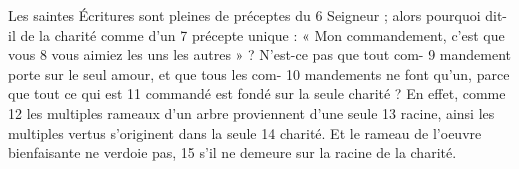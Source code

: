Les saintes Écritures sont pleines de préceptes du	 
6	 	Seigneur ; alors pourquoi dit-il de la charité comme d'un	 
7	 	précepte unique : « Mon commandement, c'est que vous	 
8	 	vous aimiez les uns les autres » ? N'est-ce pas que tout com-	 
9	 	mandement porte sur le seul amour, et que tous les com-	 
10	 	mandements ne font qu'un, parce que tout ce qui est	 
11	 	commandé est fondé sur la seule charité ? En effet, comme	 
12	 	les multiples rameaux d'un arbre proviennent d'une seule	 
13	 	racine, ainsi les multiples vertus s'originent dans la seule	 
14	 	charité. Et le rameau de l'oeuvre bienfaisante ne verdoie pas,	 
15	 	s'il ne demeure sur la racine de la charité.